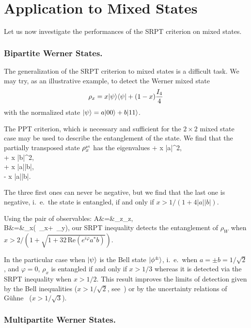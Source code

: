 \section{Application to Mixed States} \label{sec-SRPTmix}

Let us now investigate the performances of the SRPT criterion on mixed states.

\subsubsection{Bipartite Werner States.}  

The generalization of the SRPT criterion to mixed states is a difficult task. We may try, as an illustrative example, to detect the Werner mixed state ~\cite{Wer89}
\[ \rho_x = x | \psi \rangle \langle \psi | +  (1-x)\frac{I_4}4\]
with the normalized state $| \psi \rangle = a | 00 \rangle + b | 11 \rangle$. 

The PPT criterion, which is necessary and sufficient for the $2\times 2$ mixed state case may be used to describe the entanglement of the state. We find that the partially transposed state $\rho^{\mbox{\tiny \textup{pt}}}_x$ has the eigenvalues 
\bea
{} + x |a|^2, \\
 + x |b|^2, \\
 + x |a||b|, \\
 - x |a||b|.
\eea

The three first ones can never be negative, but we find that the last one is negative, i.~e.~the state is entangled, if and only if $ x > 1 / (1+4|a||b|).$ 

Using the pair of observables:
\bea A&=&\sigma_z\otimes\sigma_z, \\
  B&=&\sigma_x\otimes(\cos\varphi\, \sigma_x+\sin\varphi \, \sigma_y),
  \eea
our SRPT inequality detects the entanglement of  $\rho_W$ when $x > 2/(1+\sqrt{1+32\, \mbox{Re}(e^{i \varphi} a^* b)})$.

In the particular case when $| \psi \rangle$ is the Bell state $| \phi^\pm \rangle$, i.~e.~when $a=\pm b = 1/ \sqrt 2$, and $\varphi=0$, $\rho_x$ is entangled if and only if $x > 1/3$ whereas it is detected via the SRPT inequality  when $x > 1/2$. This result improves the limits of detection given by the Bell inequalities ($x > 1 / {\sqrt 2}$, see~\cite{Per96}) or by the uncertainty relations of G\"uhne~\cite{Guh04} ($x> 1/{\sqrt 3}$).

\subsubsection{Multipartite Werner States.} 


